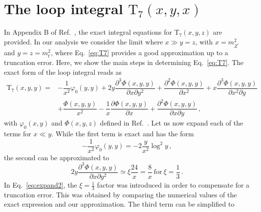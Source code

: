 \documentclass[10pt]{report}
\newcommand{\ro}[1]{\textrm{#1}}
\renewcommand{\(}{\left(}
\renewcommand{\)}{\right)}
\renewcommand{\[}{\left[}
\renewcommand{\]}{\right]}
\newcommand{\del}{\partial}
\begin{document}












\section{The loop integral \texorpdfstring{$\ro{T}_7(x,y,x)$}{} }
\label{app:T7}

In Appendix B of Ref.~\cite{Feng:2009gn}, the exact integral equations for $\ro{T}_7\(x,y,z\)$ are provided. 
In our analysis we consider the limit where $x \gg y = z$, with $x = m_{Z^\prime}^2$ and $y = z = m_t^2$, 
where Eq.~\eqref{eq:T7} provides a good approximation up to a truncation error. Here, we show the main steps 
in determining Eq.~\eqref{eq:T7}. The exact form of the loop integral reads as
\begin{equation}
\begin{aligned}
    \ro{T}_7\(x,y,y\) =& -\dfrac{1}{x^2} \varphi_0\(y,y\) + 2 y \dfrac{\del^3 \Phi(x,y,y)}{\del x \del y^2} + \dfrac{\del^2 \Phi(x,y,y)}{\del x^2} + x \dfrac{\del^3 \Phi(x,y,y)}{\del x^2 \del y} \\
    & + \dfrac{\Phi(x,y,y)}{x^2}
    -\dfrac{1}{x} \dfrac{\del \Phi(x,y,y)}{\del x}
    + \dfrac{\del^2 \Phi(x,y,y)}{\del x \del y} \,,
\end{aligned}    
\label{eq:T7-Integrals}
\end{equation}
with $\varphi_0 (x,y)$ and $\Phi(x,y,z)$ defined in Ref.~\cite{Feng:2009gn}. Let us now expand 
each of the terms for $x \ll y$. While the first term is exact and has the form
\begin{equation}
    -\dfrac{1}{x^2} \varphi_0\(y,y\) = -2 \dfrac{y}{x^2} \log^2 y \,,
    \label{eq:expand1}
\end{equation}
the second can be approximated to
\begin{equation}
    2 y \dfrac{\del^3 \Phi(x,y,y)}{\del x \del y^2} \simeq \xi \dfrac{24}{x} = \dfrac{8}{x} ~\textrm{for}~ \xi = \dfrac{1}{3}\,.
    \label{eq:expand2}
\end{equation}
In Eq.~\eqref{eq:expand2}, the $\xi = \tfrac{1}{3}$ factor was introduced in order to compensate for a truncation error. This was obtained by comparing the numerical values of the exact expression and our approximation. The third term can be simplified to
\end{document}
